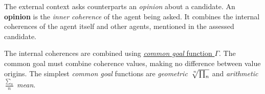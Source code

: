 \documentclass[../../header]{subfiles}
\begin{document}
\providecommand{\rootdir}{../..}

The external context asks counterparts an \emph{opinion} about a candidate.
An \textbf{opinion} is the \emph{inner coherence} of the agent being asked.
It combines the internal coherences of the agent itself and other agents,
mentioned in the assessed candidate.



The internal coherences are combined using
\underline{\emph{common goal} function $\Gamma$}.
The common goal must combine coherence values, making no difference
between value origins.
The simplest \emph{common goal} functions are \emph{geometric}
$\sqrt[\leftroot{-2}\uproot{2}n]{\prod_n}$
and \emph{arithmetic} $\frac{\sum_n}{n}$ \emph{mean}.


\end{document}
